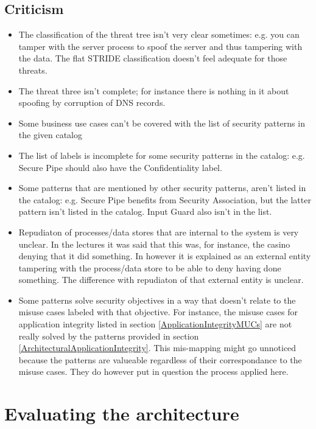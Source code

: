 \documentclass[a4paper,11pt]{report}
\begin{document}
\section{Criticism}
\label{Criticism}
\begin{itemize}
\item The classification of the threat tree isn't very clear sometimes: e.g. you can tamper with the server process
to spoof the server and thus tampering with the data. The flat STRIDE classification doesn't feel adequate for those threats.
\item The threat three isn't complete; for instance there is nothing in it about spoofing by corruption of
DNS records.
\item Some business use cases can't be covered with the list of security patterns in the given catalog
\item The list of labels is incomplete for some security patterns in the catalog: e.g. Secure Pipe should also have
the Confidentiality label.
\item Some patterns that are mentioned by other security patterns, aren't listed in the catalog: e.g. Secure Pipe
benefits from Security Association, but the latter pattern isn't listed in the catalog. Input Guard also isn't
in the list.
\item Repudiaton of processes/data stores that are internal to the system is very unclear. In the lectures it was said that this was, for instance, the casino denying that it did something. In \cite[p270]{1202957} however it is explained as an external entity tampering with the process/data store to be able to deny having done something. The difference with repudiaton of that external entity is unclear.
\item Some patterns solve security objectives in a way that doesn't relate to the misuse cases labeled with that objective. For instance, the misuse cases for application integrity listed in section \ref{ApplicationIntegrityMUCs} are not really solved by the patterns provided in section \ref{ArchitecturalApplicationIntegrity}. This mis-mapping might go unnoticed because the patterns are valueable regardless of their correspondance to the misuse cases. They do however put in question the process applied here.
\end{itemize}

\chapter{Evaluating the architecture}
\end{document}
